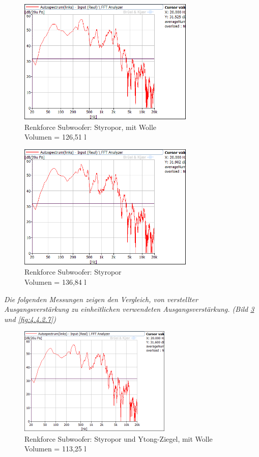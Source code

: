 \begin{figure} [H]
\centering
\includegraphics[width=0.75\textwidth]{img/Optimierung/Sub/RenkforceStyro_126l_Wolle.png}
\caption{Renkforce Subwoofer: Styropor, mit Wolle \\Volumen = 126,51 l}
\label{fig:4.4.2.4}
\end{figure}
\begin{figure} [H]
	\centering
	\includegraphics[width=0.75\textwidth]{img/Optimierung/Sub/RenkforceStyro_136l.png}
	\caption{Renkforce Subwoofer: Styropor \\Volumen = 136,84 l}
	\label{fig:4.4.2.5}
\end{figure}

\newpage
\textit{Die folgenden Messungen zeigen den Vergleich, von verstellter Ausgangsverstärkung zu einheitlichen verwendeten Ausgangsverstärkung. (Bild \ref{fig:4.4.2.6} und \ref{fig:4.4.2.7})}
\begin{figure} [H]
\centering
\includegraphics[width=0.65\textwidth]{img/Optimierung/Sub/RenkforceStyro_113l_Wolle.png}
\caption{Renkforce Subwoofer: Styropor und Ytong-Ziegel, mit Wolle \\Volumen = 113,25 l}
\label{fig:4.4.2.6}
\end{figure}

